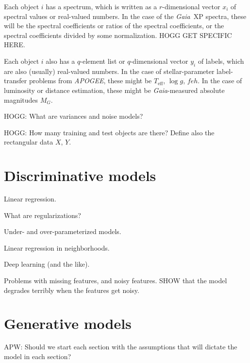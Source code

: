 \documentclass[modern]{aastex631}
\newcommand{\acronym}[1]{\small{#1}}
\newcommand{\project}[1]{\textsl{#1}}
\newcommand{\Gaia}{\project{Gaia}}
\newcommand{\APOGEE}{\project{\acronym{APOGEE}}}
\newcommand{\teff}{T_{\mathrm{eff}}}
\newcommand{\logg}{\log g}
\begin{document}
Each object $i$ has a spectrum, which is written as a $r$-dimensional vector $x_i$ of spectral values or real-valued numbers.
In the case of the \Gaia\ XP spectra, these will be the spectral coefficients or ratios of the spectral coefficients, or the spectral coefficients divided by some normalization. HOGG GET SPECIFIC HERE.

Each object $i$ also has a $q$-element list or $q$-dimensional vector $y_i$ of labels, which are also (usually) real-valued numbers.
In the case of stellar-parameter label-transfer problems from \APOGEE, these might be $\teff$, $\logg$, $feh$.
In the case of luminosity or distance estimation, these might be \Gaia-measured absolute magnitudes $M_G$.

HOGG: What are variances and noise models?

HOGG: How many training and test objects are there?
Define also the rectangular data $X$, $Y$.

\section{Discriminative models}

Linear regression.

What are regularizations?

Under- and over-parameterized models.

Linear regression in neighborhoods.

Deep learning (and the like).

Problems with missing features, and noisy features. SHOW that the model degrades terribly when the features get noisy.

\section{Generative models}

APW: Should we start each section with the assumptions that will dictate the model in each section?
\end{document}
